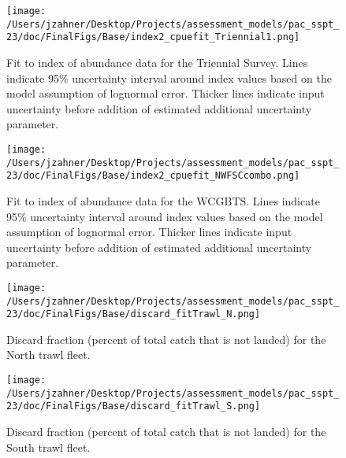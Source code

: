 \documentclass[11pt,
  letterpaper,
]{article}
\begin{document}
\begin{figure}
{\centering
\texttt{[image: /Users/jzahner/Desktop/Projects/assessment\_models/pac\_sspt\_23/doc/FinalFigs/Base/index2\_cpuefit\_Triennial1.png]}
}
\caption{Fit to index of abundance data for the Triennial Survey. Lines indicate 95\% uncertainty interval around index values based on the model assumption of lognormal error. Thicker lines indicate input uncertainty before addition of estimated additional uncertainty parameter.\label{fig:fitsTri1}}
\end{figure}

\begin{figure}
{\centering
\texttt{[image: /Users/jzahner/Desktop/Projects/assessment\_models/pac\_sspt\_23/doc/FinalFigs/Base/index2\_cpuefit\_NWFSCcombo.png]}
}
\caption{Fit to index of abundance data for the WCGBTS. Lines indicate 95\% uncertainty interval around index values based on the model assumption of lognormal error. Thicker lines indicate input uncertainty before addition of estimated additional uncertainty parameter.\label{fig:fitscombo}}
\end{figure}

\begin{figure}
{\centering
\texttt{[image: /Users/jzahner/Desktop/Projects/assessment\_models/pac\_sspt\_23/doc/FinalFigs/Base/discard\_fitTrawl\_N.png]}
}
\caption{Discard fraction (percent of total catch that is not landed) for the North trawl fleet.\label{fig:northtrl_disc}}
\end{figure}

\begin{figure}
{\centering
\texttt{[image: /Users/jzahner/Desktop/Projects/assessment\_models/pac\_sspt\_23/doc/FinalFigs/Base/discard\_fitTrawl\_S.png]}
}
\caption{Discard fraction (percent of total catch that is not landed) for the South trawl fleet.\label{fig:southtrl_disc}}
\end{figure}
\end{document}

